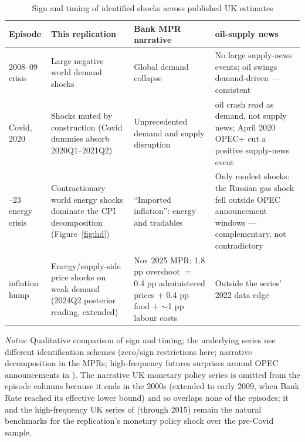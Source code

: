 \begin{table}[t]
\centering
\caption{Sign and timing of identified shocks across published UK estimates}
\label{tab:shockcompare}
\footnotesize
\begin{tabularx}{\textwidth}{@{}l>{\raggedright\arraybackslash}X>{\raggedright\arraybackslash}X>{\raggedright\arraybackslash}X@{}}
\toprule
Episode & This replication & Bank MPR narrative & \citet{kanzig2021} oil-supply news \\
\midrule
2008--09 crisis & Large negative world demand shocks & Global demand collapse & No large supply-news events; oil swings demand-driven --- consistent \\
\addlinespace
Covid, 2020 & Shocks muted by construction (Covid dummies absorb 2020Q1--2021Q2) & Unprecedented demand and supply disruption & 2020 oil crash read as demand, not supply news; April 2020 OPEC+ cut a positive supply-news event \\
\addlinespace
2021--23 energy crisis & Contractionary world energy shocks dominate the CPI decomposition (Figure~\ref{fig:hd}) & ``Imported inflation'': energy and tradables & Only modest shocks: the Russian gas shock fell outside OPEC announcement windows --- complementary, not contradictory \\
\addlinespace
2025 inflation hump & Energy/supply-side price shocks on weak demand (2024Q2 posterior reading, extended) & Nov 2025 MPR: 1.8 pp overshoot $=$ 0.4 pp administered prices $+$ 0.4 pp food $+$ $\sim$1 pp labour costs & Outside the series' 2022 data edge \\
\bottomrule
\end{tabularx}
\par\smallskip
\parbox{0.97\textwidth}{\footnotesize \emph{Notes:} Qualitative comparison of sign and timing; the underlying series use different identification schemes (zero/sign restrictions here; narrative decomposition in the MPRs; high-frequency futures surprises around OPEC announcements in \citealp{kanzig2021}). The \citet{cloyne2016} narrative UK monetary policy series is omitted from the episode columns because it ends in the 2000s (extended to early 2009, when Bank Rate reached its effective lower bound) and so overlaps none of the episodes; it and the high-frequency UK series of \citet{cesabianchi2020} (through 2015) remain the natural benchmarks for the replication's monetary policy shock over the pre-Covid sample.}
\end{table}

